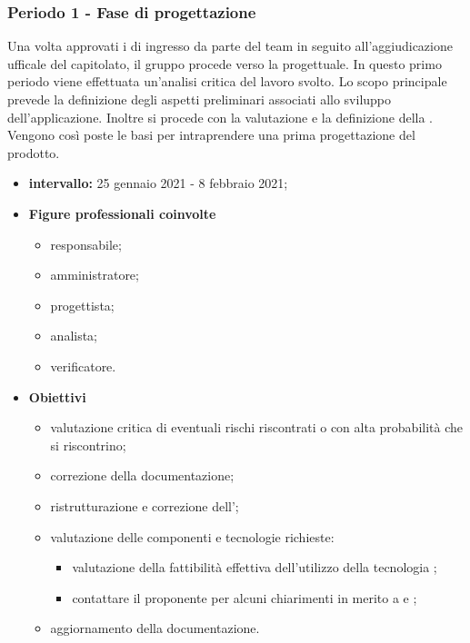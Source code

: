        \subsubsection{Periodo 1 - Fase di progettazione}
        Una volta approvati i  di ingresso da parte del team in seguito all'aggiudicazione ufficale del capitolato, il gruppo procede verso la  progettuale. In questo primo periodo viene effettuata un'analisi critica del lavoro svolto. Lo scopo principale prevede la definizione degli aspetti preliminari associati allo sviluppo dell'applicazione. Inoltre si procede con la valutazione e la definizione della . Vengono così poste le basi per intraprendere una prima progettazione del prodotto.
        \begin{itemize}
                \item \textbf{intervallo: } 25 gennaio 2021 - 8 febbraio 2021;
                \item  \textbf{Figure professionali coinvolte}
                \begin{itemize}
                    \item responsabile;
                    \item amministratore;
                    \item progettista;
                    \item analista;
                    \item verificatore.
                \end{itemize}
                \item \textbf{Obiettivi}
                \begin{itemize}
                    \item valutazione critica di eventuali rischi riscontrati o con alta probabilità che si riscontrino;
                    \item correzione della documentazione;
                    \item ristrutturazione e correzione dell'\AdR;
                    \item valutazione delle componenti e tecnologie richieste:
                    \begin{itemize}
                        \item valutazione della fattibilità effettiva dell'utilizzo della tecnologia ;
                        \item contattare il proponente per alcuni chiarimenti in merito a  e ;
                    \end{itemize}

                    \item aggiornamento della documentazione.
                    
                \end{itemize}
        \end{itemize}


